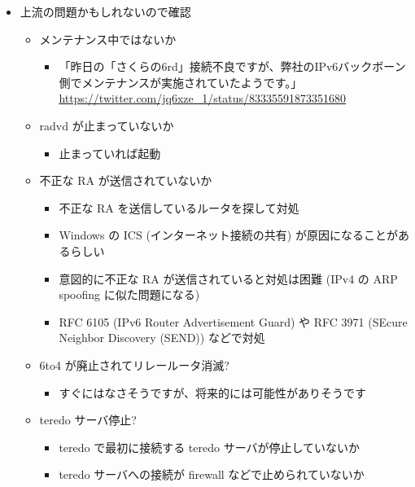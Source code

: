 \documentclass[mingoth,a4paper]{jsarticle}
\begin{document}
\begin{itemize}
\item 上流の問題かもしれないので確認

\begin{itemize}
\item メンテナンス中ではないか

\begin{itemize}
\item 「昨日の「さくらの6rd」接続不良ですが、弊社のIPv6バックボーン側でメンテナンスが実施されていたようです。」
      \url{https://twitter.com/jq6xze\_1/status/83335591873351680}
\end{itemize}

\item radvd が止まっていないか

\begin{itemize}
\item 止まっていれば起動
\end{itemize}

\item 不正な RA が送信されていないか

\begin{itemize}
\item 不正な RA を送信しているルータを探して対処
\item Windows の ICS (インターネット接続の共有) が原因になることがあるらしい
\item 意図的に不正な RA が送信されていると対処は困難 (IPv4 の ARP spoofing に似た問題になる)
\item RFC 6105 (IPv6 Router Advertisement Guard) や RFC 3971 (SEcure Neighbor Discovery (SEND)) などで対処
\end{itemize}

\item 6to4 が廃止されてリレールータ消滅?

\begin{itemize}
\item すぐにはなさそうですが、将来的には可能性がありそうです
\end{itemize}

\item teredo サーバ停止?

\begin{itemize}
\item teredo で最初に接続する teredo サーバが停止していないか
\item teredo サーバへの接続が firewall などで止められていないか
\end{itemize}

\end{itemize}

\end{itemize}
\end{document}
